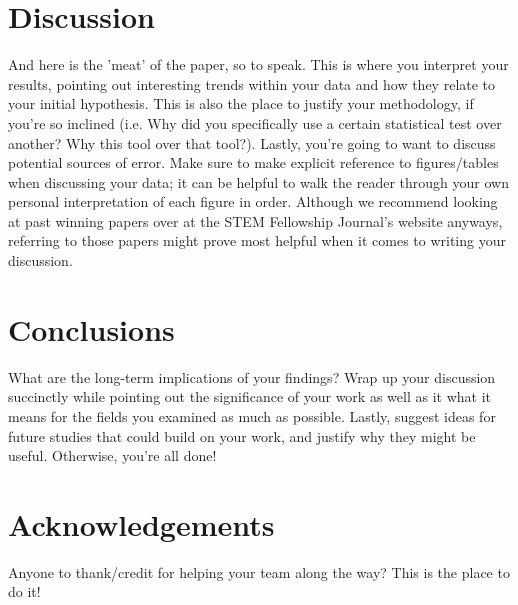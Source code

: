 \documentclass[10pt, letterpaper]{article}
\begin{document}
\section{Discussion}
And here is the 'meat' of the paper, so to speak. This is where you interpret your results, pointing out interesting trends within your data and how they relate to your initial hypothesis. This is also the place to justify your methodology, if you're so inclined (i.e. Why did you specifically use a certain statistical test over another? Why this tool over that tool?). Lastly, you're going to want to discuss potential sources of error. Make sure to make explicit reference to figures/tables when discussing your data; it can be helpful to walk the reader through your own personal interpretation of each figure in order. Although we recommend looking at past winning papers over at the STEM Fellowship Journal's website anyways, referring to those papers might prove most helpful when it comes to writing your discussion.


\section*{Conclusions}
What are the long-term implications of your findings? Wrap up your discussion succinctly while pointing out the significance of your work as well as it what it means for the fields you examined as much as possible. Lastly, suggest ideas for future studies that could build on your work, and justify why they might be useful. Otherwise, you're all done!


\section*{Acknowledgements}
Anyone to thank/credit for helping your team along the way? This is the place to do it!



\end{document}
